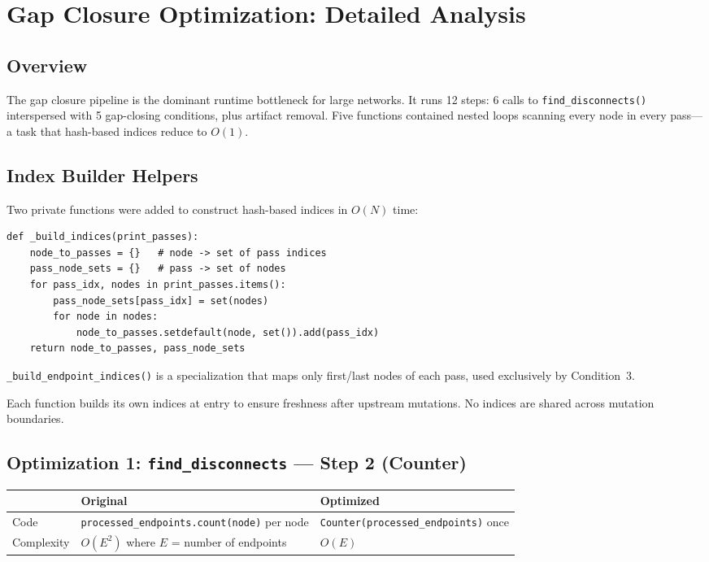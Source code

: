 \documentclass[11pt,a4paper]{article}
\begin{document}
\section{Gap Closure Optimization: Detailed Analysis}
\label{sec:gap-closure-detail}

\subsection{Overview}

The gap closure pipeline is the dominant runtime bottleneck for large networks. It runs 12 steps: 6 calls to \texttt{find\_disconnects()} interspersed with 5 gap-closing conditions, plus artifact removal. Five functions contained nested loops scanning every node in every pass---a task that hash-based indices reduce to $O(1)$.

\subsection{Index Builder Helpers}

Two private functions were added to construct hash-based indices in $O(N)$ time:

\begin{lstlisting}[caption={Index builder: node $\rightarrow$ passes mapping}]
def _build_indices(print_passes):
    node_to_passes = {}   # node -> set of pass indices
    pass_node_sets = {}   # pass -> set of nodes
    for pass_idx, nodes in print_passes.items():
        pass_node_sets[pass_idx] = set(nodes)
        for node in nodes:
            node_to_passes.setdefault(node, set()).add(pass_idx)
    return node_to_passes, pass_node_sets
\end{lstlisting}

\texttt{\_build\_endpoint\_indices()} is a specialization that maps only first/last nodes of each pass, used exclusively by Condition~3.

Each function builds its own indices at entry to ensure freshness after upstream mutations. No indices are shared across mutation boundaries.

\subsection{Optimization 1: \texttt{find\_disconnects} --- Step 2 (Counter)}

\begin{table}[H]
\centering
\begin{tabularx}{\textwidth}{lXX}
\toprule
& \textbf{Original} & \textbf{Optimized} \\
\midrule
Code & \texttt{processed\_endpoints.count(node)} per node & \texttt{Counter(processed\_endpoints)} once \\
Complexity & $O(E^2)$ where $E$ = number of endpoints & $O(E)$ \\
\bottomrule
\end{tabularx}
\end{table}
\end{document}
